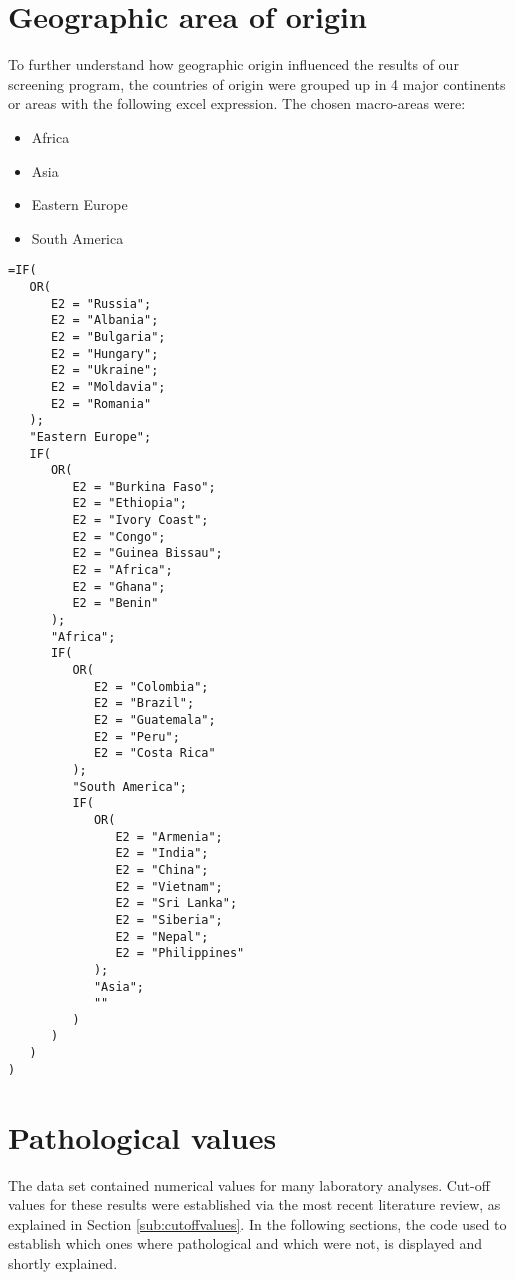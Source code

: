 \section{Geographic area of origin}\label{sec:geographicarea}
To further understand how geographic origin influenced the results of our screening program, the countries of origin were grouped up in 4 major continents or areas with the following excel expression. The chosen macro-areas were:
\begin{itemize}
    \item Africa
    \item Asia
    \item Eastern Europe
    \item South America
\end{itemize}

\begin{lstlisting}
=IF(
   OR(
      E2 = "Russia";
      E2 = "Albania";
      E2 = "Bulgaria";
      E2 = "Hungary";
      E2 = "Ukraine";
      E2 = "Moldavia";
      E2 = "Romania"
   );
   "Eastern Europe";
   IF(
      OR(
         E2 = "Burkina Faso";
         E2 = "Ethiopia";
         E2 = "Ivory Coast";
         E2 = "Congo";
         E2 = "Guinea Bissau";
         E2 = "Africa";
         E2 = "Ghana";
         E2 = "Benin"
      );
      "Africa";
      IF(
         OR(
            E2 = "Colombia";
            E2 = "Brazil";
            E2 = "Guatemala";
            E2 = "Peru";
            E2 = "Costa Rica"
         );
         "South America";
         IF(
            OR(
               E2 = "Armenia";
               E2 = "India";
               E2 = "China";
               E2 = "Vietnam";
               E2 = "Sri Lanka";
               E2 = "Siberia";
               E2 = "Nepal";
               E2 = "Philippines"
            );
            "Asia";
            ""
         )
      )
   )
)
\end{lstlisting}

\section{Pathological values}\label{sec:pathologicalvalues}
The data set contained numerical values for many laboratory analyses. Cut-off values for these results were established via the most recent literature review, as explained in Section \ref{sub:cutoffvalues}. In the following sections, the code used to establish which ones where pathological and which were not, is displayed and shortly explained.

